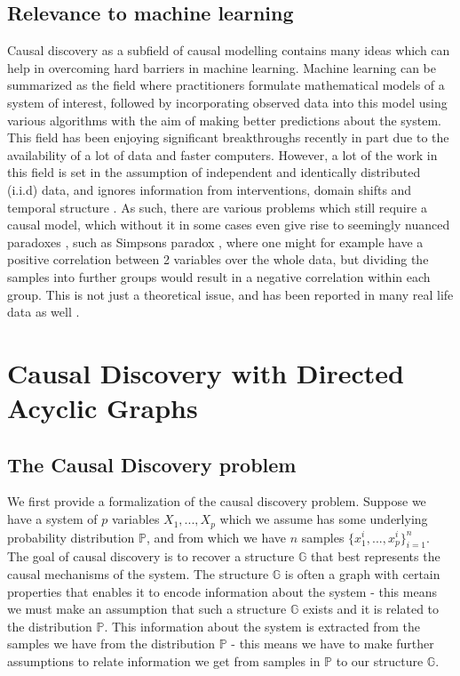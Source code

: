 \documentclass{tufte-book}
\begin{document}
\section{Relevance to machine learning}
\label{sec:org9e3cf04}
Causal discovery as a subfield of causal modelling contains many ideas which can help in overcoming hard barriers in machine learning. Machine learning can be summarized as the field where practitioners formulate mathematical models of a system of interest, followed by incorporating observed data into this model using various algorithms with the aim of making better predictions about the system. This field has been enjoying significant breakthroughs recently in part due to the availability of a lot of data and faster computers. However, a lot of the work in this field is set in the assumption of independent and identically distributed (i.i.d) data, and ignores information from interventions, domain shifts and temporal structure \cite{schoelkopf-2019-causal-machin-learn}. As such, there are various problems which still require a causal model, which without it in some cases even give rise to seemingly nuanced paradoxes \cite{pearl-2018-book-why}, such as Simpsons paradox \cite{simpson-1951-inter-inter}, where one might for example have a positive correlation between 2 variables over the whole data, but dividing the samples into further groups would result in a negative correlation within each group.  This is not just a theoretical issue, and has been reported in many real life data as well \cite{wagner-1982-simps-parad}.


\chapter{Causal Discovery with Directed Acyclic Graphs}
\label{sec:org8bfd4e6}
\section{The Causal Discovery problem}
\label{sec:org40f26df}
We first provide a formalization of the causal discovery problem. Suppose we have a system of \(p\) variables \(X_1,...,X_p\) which we assume has some underlying probability distribution \(\mathbb{P}\), and from which we have \(n\) samples \(\{x_1^i,...,x_p^i\}_{i=1}^n\). The goal of causal discovery is to recover a structure \(\mathbb{G}\) that best represents the causal mechanisms of the system. The structure \(\mathbb{G}\) is often a graph with certain properties that enables it to encode information about the system - this means we must make an assumption that such a structure \(\mathbb{G}\) exists and it is related to the distribution \(\mathbb{P}\). This information about the system is extracted from the samples we have from the distribution \(\mathbb{P}\) - this means we have to make further assumptions to relate information we get from samples in \(\mathbb{P}\) to our structure \(\mathbb{G}\).
\end{document}
